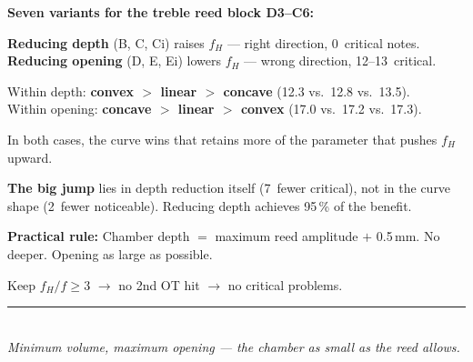 \documentclass[11pt,a4paper]{article}
\begin{document}
\begin{keybox}
\textbf{Seven variants for the treble reed block D3--C6:}

\textbf{Reducing depth} (B, C, Ci) raises $f_H$ --- right direction, 0~critical notes.\\
\textbf{Reducing opening} (D, E, Ei) lowers $f_H$ --- wrong direction, 12--13~critical.

Within depth: \textbf{convex $>$ linear $>$ concave} (12.3 vs.\ 12.8 vs.\ 13.5).\\
Within opening: \textbf{concave $>$ linear $>$ convex} (17.0 vs.\ 17.2 vs.\ 17.3).

In both cases, the curve wins that retains more of the parameter that pushes $f_H$ upward.

\textbf{The big jump} lies in depth reduction itself (7~fewer critical), not in the curve shape (2~fewer noticeable). Reducing depth achieves 95\,\% of the benefit.

\textbf{Practical rule:} Chamber depth $=$ maximum reed amplitude $+$ 0.5\,mm. No deeper. Opening as large as possible.

Keep $f_H/f \geq 3$ $\to$ no 2nd OT hit $\to$ no critical problems.
\end{keybox}

\vspace{3mm}
\begin{center}
\textcolor{accentred}{\rule{0.6\textwidth}{1pt}}\\[4pt]
{\small\itshape Minimum volume, maximum opening --- the chamber as small as the reed allows.}
\end{center}
\end{document}
